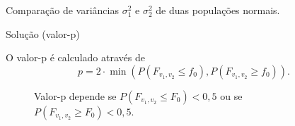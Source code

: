 \documentclass[9pt]{beamer}
\begin{document}
\begin{frame}{Comparação de variâncias $\sigma_1^2$ e $\sigma_2^2$ de duas populações normais.}

\begin{block}{Solução (valor-p)}

O valor-p é calculado através de 
$$p = 2\cdot \min \left( P(F_{v_1, v_2} \leq f_0), P(F_{v_1, v_2} \geq f_0)  \right).$$


\begin{figure}[htbp]
		\centering
		\caption{Valor-p depende se $P\left( F_{v_1, v_2} \leq F_0 \right)< 0,5$ ou se $P\left( F_{v_1, v_2} \geq F_0 \right) < 0,5$.}
\end{figure}

\end{block}

\end{frame}
\end{document}
